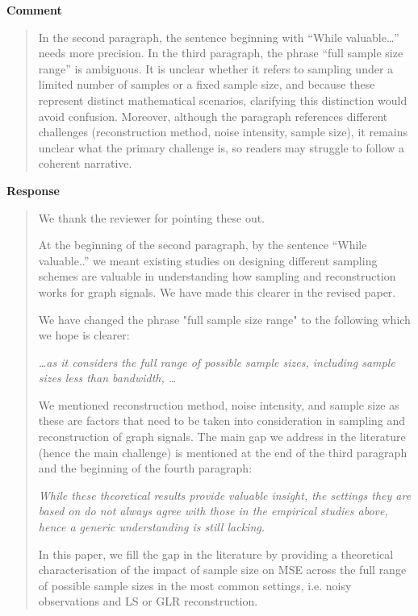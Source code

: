 \documentclass[11pt,onecolumn,journal]{IEEEtran}
\theoremstyle{definition}
\begin{document}
\textbf{Comment}
\begin{quote}

In the second paragraph, the sentence beginning with “While valuable…” needs more precision. In the third paragraph, the phrase “full sample size range” is ambiguous. It is unclear whether it refers to sampling under a limited number of samples or a fixed sample size, and because these represent distinct mathematical scenarios, clarifying this distinction would avoid confusion. Moreover, although the paragraph references different challenges (reconstruction method, noise intensity, sample size), it remains unclear what the primary challenge is, so readers may struggle to follow a coherent narrative.
\end{quote}
\textbf{Response}
\begin{quote}
We thank the reviewer for pointing these out.

At the beginning of the second paragraph, by the sentence ``While valuable..'' we meant existing studies on designing different sampling schemes are valuable in understanding how sampling and reconstruction works for graph signals. We have made this clearer in the revised paper. 

We have changed the phrase "full sample size range" to the following which we hope is clearer:

{\it \ldots as it considers the \emph{full range of possible sample sizes, including sample sizes less than bandwidth,} \ldots}

We mentioned reconstruction method, noise intensity, and sample size as these are factors that need to be taken into consideration in sampling and reconstruction of graph signals. The main gap we address in the literature (hence the main challenge) is mentioned at the end of the third paragraph and the beginning of the fourth paragraph: 

{\it While these theoretical results provide valuable insight, the settings they are based on do not always agree with those in the empirical studies above, hence a generic understanding is still lacking.

In this paper, we fill the gap in the literature by providing a theoretical characterisation of the impact of sample size on MSE across the full range of possible sample sizes in the most common settings, i.e. noisy observations and LS or GLR reconstruction.}



\end{quote}
\end{document}
